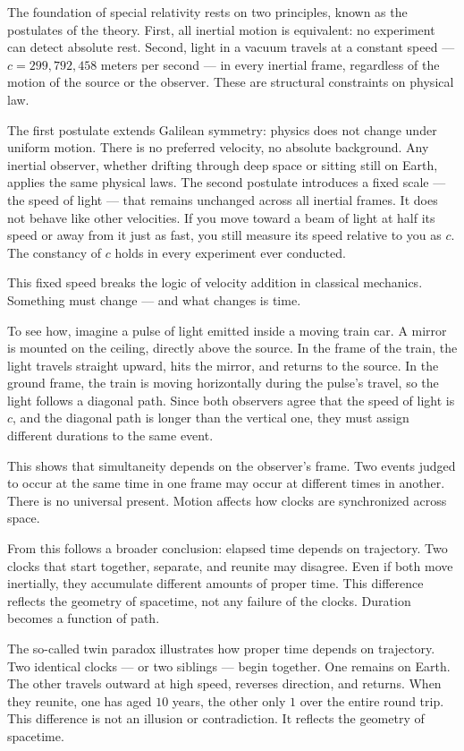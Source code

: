 The foundation of special relativity rests on two principles, known as the postulates of the theory. First, all inertial motion is equivalent: no experiment can detect absolute rest. Second, light in a vacuum travels at a constant speed — $c = 299{,}792{,}458$ meters per second — in every inertial frame, regardless of the motion of the source or the observer. These are structural constraints on physical law.

The first postulate extends Galilean symmetry: physics does not change under uniform motion. There is no preferred velocity, no absolute background. Any inertial observer, whether drifting through deep space or sitting still on Earth, applies the same physical laws. The second postulate introduces a fixed scale — the speed of light — that remains unchanged across all inertial frames. It does not behave like other velocities. If you move toward a beam of light at half its speed or away from it just as fast, you still measure its speed relative to you as $c$. The constancy of $c$ holds in every experiment ever conducted.

This fixed speed breaks the logic of velocity addition in classical mechanics. Something must change — and what changes is time.

To see how, imagine a pulse of light emitted inside a moving train car. A mirror is mounted on the ceiling, directly above the source. In the frame of the train, the light travels straight upward, hits the mirror, and returns to the source. In the ground frame, the train is moving horizontally during the pulse's travel, so the light follows a diagonal path. Since both observers agree that the speed of light is $c$, and the diagonal path is longer than the vertical one, they must assign different durations to the same event.

This shows that simultaneity depends on the observer's frame. Two events judged to occur at the same time in one frame may occur at different times in another. There is no universal present. Motion affects how clocks are synchronized across space.

From this follows a broader conclusion: elapsed time depends on trajectory. Two clocks that start together, separate, and reunite may disagree. Even if both move inertially, they accumulate different amounts of proper time. This difference reflects the geometry of spacetime, not any failure of the clocks. Duration becomes a function of path.


The so-called twin paradox illustrates how proper time depends on trajectory. Two identical clocks — or two siblings — begin together. One remains on Earth. The other travels outward at high speed, reverses direction, and returns. When they reunite, one has aged $10$ years, the other only $1$ over the entire round trip. This difference is not an illusion or contradiction. It reflects the geometry of spacetime.

